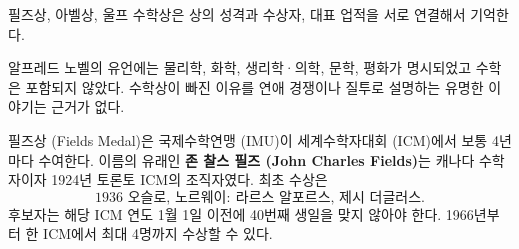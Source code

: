 

필즈상, 아벨상, 울프 수학상은 상의 성격과 수상자, 대표 업적을 서로 연결해서 기억한다.

\begin{fact}[노벨 수학상이 없는 이유]
알프레드 노벨의 유언에는 물리학, 화학, 생리학·의학, 문학, 평화가 명시되었고 수학은 포함되지 않았다. 수학상이 빠진 이유를 연애 경쟁이나 질투로 설명하는 유명한 이야기는 근거가 없다.
\end{fact}


\begin{fact}[필즈상 기본]
필즈상 (Fields Medal)은 국제수학연맹 (IMU)이 세계수학자대회 (ICM)에서 보통 4년마다 수여한다. 이름의 유래인 \textbf{존 찰스 필즈 (John Charles Fields)}는 캐나다 수학자이자 1924년 토론토 ICM의 조직자였다. 최초 수상은
\[
\boxed{1936\text{ 오슬로, 노르웨이}:\ \text{라르스 알포르스, 제시 더글러스}}.
\]
후보자는 해당 ICM 연도 1월 1일 이전에 40번째 생일을 맞지 않아야 한다. 1966년부터 한 ICM에서 최대 4명까지 수상할 수 있다.
\end{fact}

